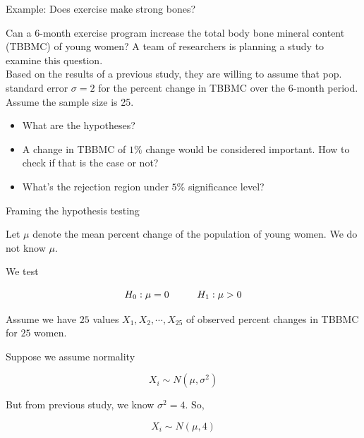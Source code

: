 \documentclass{beamer}\usepackage[]{graphicx}\usepackage[]{color}
\begin{document}
\begin{frame}{Example: Does exercise make strong bones?}

    Can a 6-month exercise program increase the total body bone
    mineral content (TBBMC) of young women? 
    A team of researchers is planning a study to examine this question.\\ \pause
\bigskip
    Based on the results of
    a previous study, they are willing to assume that pop. standard error $\sigma=2$ for the percent change in TBBMC over the 6-month period. Assume the sample size
     is 25.\\ \pause
    \begin{itemize}
    \item
    What are the hypotheses? \pause
    \item
    A change in TBBMC of $1\%$ change would be considered important. How to check if that is the case or not?
     \item
    What's the rejection region under $5\%$ significance level? \pause
 \end{itemize}

\end{frame}

\begin{frame}{Framing the hypothesis testing}

Let $\mu$ denote the mean percent change of the population of young women. We do not know $\mu$.  \pause \newline

We test 

$$ H_{0}: \mu = 0 \hspace{1 cm}  H_{1}: \mu > 0 $$ \pause

Assume we have $25$ values $X_1, X_2, \cdots, X_{25}$ of observed percent changes in TBBMC for $25$ women. \pause

Suppose we assume normality 

$$ X_i \sim N(\mu, \sigma^2) $$ \pause

But from previous study, we know $\sigma^2=4$. So,  \pause

$$ X_i \sim N(\mu, 4) $$ 

\end{frame}
\end{document}
